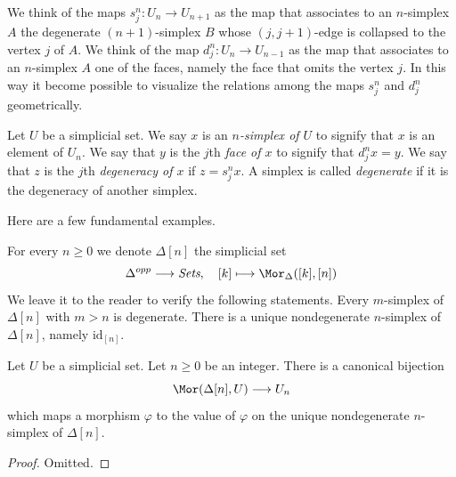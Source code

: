 \medskip\noindent
We think of the maps $s^n_j : U_n \to U_{n + 1}$ as
the map that associates to an $n$-simplex $A$ the degenerate
$(n + 1)$-simplex $B$ whose $(j, j + 1)$-edge is collapsed
to the vertex $j$ of $A$. We think of the map $d^n_j : U_n \to U_{n - 1}$
as the map that associates to an $n$-simplex $A$ one of the
faces, namely the face that omits the vertex $j$.
In this way it become possible to visualize the relations
among the maps $s^n_j$ and $d^n_j$ geometrically.

\begin{definition}
\label{definition-terminology-simplicial-sets}
Let $U$ be a simplicial set.
We say $x$ is an {\it $n$-simplex of $U$} to signify that
$x$ is an element of $U_n$. We say that $y$ is the $j$th
{\it face of $x$} to signify that $d^n_jx = y$. We say that
$z$ is the $j$th {\it degeneracy of $x$} if $z = s^n_jx$.
A simplex is called {\it degenerate} if it is the degeneracy
of another simplex.
\end{definition}

\noindent
Here are a few fundamental examples.

\begin{example}
\label{example-simplex-simplicial-set}
For every $n \geq 0$ we denote $\Delta[n]$ the simplicial set
$$
\Delta^{opp} \longrightarrow \textit{Sets},\quad
[k] \longmapsto \Mor_{\Delta}([k], [n])
$$
We leave it to the reader to verify the following statements.
Every $m$-simplex of $\Delta[n]$ with $m > n$ is degenerate.
There is a unique nondegenerate $n$-simplex of $\Delta[n]$,
namely $\text{id}_{[n]}$.
\end{example}

\begin{lemma}
\label{lemma-simplex-map}
Let $U$ be a simplicial set. Let $n \geq 0$ be an integer.
There is a canonical bijection
$$
\Mor(\Delta[n], U)
\longrightarrow
U_n
$$
which maps a morphism $\varphi$ to the value of $\varphi$
on the unique nondegenerate $n$-simplex of $\Delta[n]$.
\end{lemma}

\begin{proof}
Omitted.
\end{proof}

